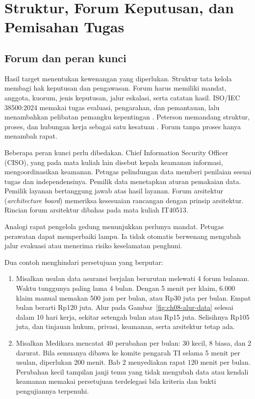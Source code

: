 \section{Struktur, Forum Keputusan, dan Pemisahan Tugas}

\subsection*{Forum dan peran kunci}

Hasil target menentukan kewenangan yang diperlukan. Struktur tata kelola membagi hak keputusan
dan pengawasan. Forum harus memiliki mandat, anggota, kuorum, jenis keputusan, jalur eskalasi,
serta catatan hasil. ISO/IEC 38500:2024 memakai tugas evaluasi, pengarahan, dan pemantauan, lalu
menambahkan pelibatan pemangku kepentingan \cite{c02-iso-perubahan}. Peterson memandang struktur,
proses, dan hubungan kerja sebagai satu kesatuan \cite{c02-peterson2004}. Forum tanpa proses
hanya menambah rapat.

Beberapa peran kunci perlu dibedakan. Chief Information Security Officer (CISO), yang pada mata
kuliah lain disebut kepala keamanan informasi, mengoordinasikan keamanan. Petugas pelindungan data memberi penilaian sesuai tugas dan independensinya. Pemilik
data menetapkan aturan pemakaian data. Pemilik layanan bertanggung jawab atas hasil layanan.
Forum arsitektur (\textit{architecture board}) memeriksa kesesuaian rancangan dengan prinsip
arsitektur. Rincian forum arsitektur dibahas pada mata kuliah IT40513.

Analogi rapat pengelola gedung menunjukkan perlunya mandat. Petugas perawatan dapat memperbaiki
lampu. Ia tidak otomatis berwenang mengubah jalur evakuasi atau menerima risiko keselamatan
penghuni.

Dua contoh menghindari persetujuan yang berputar:
\begin{enumerate}
  \item Misalkan usulan data asuransi berjalan berurutan melewati 4 forum bulanan. Waktu
  tunggunya paling lama 4 bulan. Dengan 5 menit per klaim, 6.000 klaim manual memakan 500 jam per
  bulan, atau Rp30 juta per bulan. Empat bulan berarti Rp120 juta. Alur pada
  Gambar~\ref{fig:ch08-alur-data} selesai dalam 10 hari kerja, sekitar setengah bulan atau Rp15
  juta. Selisihnya Rp105 juta, dan tinjauan hukum, privasi, keamanan, serta arsitektur tetap ada.
  \item Misalkan Medikara mencatat 40 perubahan per bulan: 30 kecil, 8 biasa, dan 2 darurat. Bila
  semuanya dibawa ke komite pengarah TI selama 5 menit per usulan, diperlukan 200 menit. Bab 2
  menyediakan rapat 120 menit per bulan. Perubahan kecil tampilan janji temu yang tidak mengubah
  data atau kendali keamanan memakai persetujuan terdelegasi bila kriteria dan bukti pengujiannya
  terpenuhi.
\end{enumerate}

